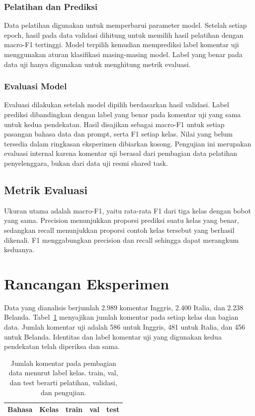 \documentclass[11pt]{article}
\begin{document}
\subsubsection{Pelatihan dan Prediksi}
Data pelatihan digunakan untuk memperbarui parameter model. Setelah setiap epoch, hasil pada data validasi dihitung untuk memilih hasil pelatihan dengan macro-F1 tertinggi. Model terpilih kemudian memprediksi label komentar uji menggunakan aturan klasifikasi masing-masing model. Label yang benar pada data uji hanya digunakan untuk menghitung metrik evaluasi.

\subsubsection{Evaluasi Model}
Evaluasi dilakukan setelah model dipilih berdasarkan hasil validasi. Label prediksi dibandingkan dengan label yang benar pada komentar uji yang sama untuk kedua pendekatan. Hasil disajikan sebagai macro-F1 untuk setiap pasangan bahasa data dan prompt, serta F1 setiap kelas. Nilai yang belum tersedia dalam ringkasan eksperimen dibiarkan kosong. Pengujian ini merupakan evaluasi internal karena komentar uji berasal dari pembagian data pelatihan penyelenggara, bukan dari data uji resmi shared task.

\subsection{Metrik Evaluasi}
Ukuran utama adalah macro-F1, yaitu rata-rata F1 dari tiga kelas dengan bobot yang sama. Precision menunjukkan proporsi prediksi suatu kelas yang benar, sedangkan recall menunjukkan proporsi contoh kelas tersebut yang berhasil dikenali. F1 menggabungkan precision dan recall sehingga dapat merangkum keduanya.

\section{Rancangan Eksperimen}
Data yang dianalisis berjumlah 2.989 komentar Inggris, 2.400 Italia, dan 2.238 Belanda. Tabel~\ref{tab:data} menyajikan jumlah komentar pada setiap kelas dan bagian data. Jumlah komentar uji adalah 586 untuk Inggris, 481 untuk Italia, dan 456 untuk Belanda. Identitas dan label komentar uji yang digunakan kedua pendekatan telah diperiksa dan sama.

\begin{table}[t]
\centering
\small
\setlength{\tabcolsep}{3pt}
\begin{tabular}{llrrr}
\toprule
Bahasa & Kelas & train & val & test \\
\midrule

\end{tabular}
\caption{Jumlah komentar pada pembagian data menurut label kelas. train, val, dan test berarti pelatihan, validasi, dan pengujian.}
\label{tab:data}
\end{table}
\end{document}
